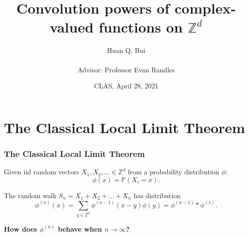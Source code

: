 \documentclass{beamer}
\title[A generalized integration formula...]
{
	Convolution powers
	of complex-valued functions on $\mathbb{Z}^d$
}
\author[Bui \& Randles] %
{Huan Q. Bui \\
	$\,$\\
	Advisor: Professor Evan Randles}
\institute[Colby College] %
{
}
\date{CLAS, April 28, 2021}
\theoremstyle{definition}
\begin{document}
 
\frame{\titlepage}




 



\section{The Classical Local Limit Theorem}
\begin{frame}
\frametitle{The Classical Local Limit Theorem}

Given iid random vectors $X_1, X_2, \dots \in \mathbb{Z}^d$ from a probability distribution $\phi$:
\begin{equation*}
\phi(x) = \mathbb{P}(X_i = x).
\end{equation*}




The random walk $S_n = X_1 + X_2 + \dots + X_n$ has distribution
\begin{equation*}
\phi^{(n)}(x)=\sum_{y\in\mathbb{Z}^d}\phi^{(n-1)}(x-y)\phi(y) = \phi^{(n-1)}\ast \phi^{(1)}.
\end{equation*}

\textbf{How does $\phi^{(n)}$ behave when $n\to \infty$?}

\end{frame}
\end{document}
